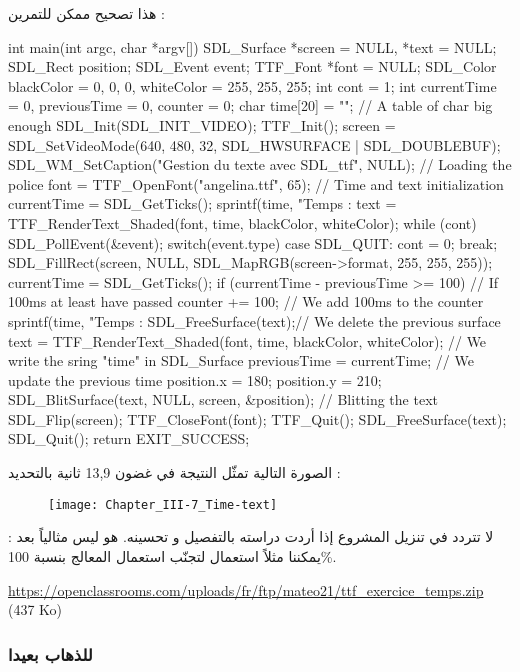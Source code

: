 هذا تصحيح ممكن للتمرين :

\begin{Csource}
int main(int argc, char *argv[])
{
	SDL_Surface *screen = NULL, *text = NULL;
	SDL_Rect position;
	SDL_Event event;
	TTF_Font *font = NULL;
	SDL_Color blackColor = {0, 0, 0}, whiteColor = {255, 255, 255};
	int cont = 1;
	int currentTime = 0, previousTime = 0, counter = 0;
	char time[20] = ""; // A table of char big enough
	SDL_Init(SDL_INIT_VIDEO);
	TTF_Init();
	screen = SDL_SetVideoMode(640, 480, 32, SDL_HWSURFACE | SDL_DOUBLEBUF);
	SDL_WM_SetCaption("Gestion du texte avec SDL_ttf", NULL);
	// Loading the police
	font = TTF_OpenFont("angelina.ttf", 65);
	// Time and text initialization
	currentTime = SDL_GetTicks();
	sprintf(time, "Temps : %
	text = TTF_RenderText_Shaded(font, time, blackColor, whiteColor);
	while (cont)
	{
		SDL_PollEvent(&event);
		switch(event.type)
		{
			case SDL_QUIT:
			cont = 0;
			break;
		}
		SDL_FillRect(screen, NULL, SDL_MapRGB(screen->format, 255, 255, 255));
		currentTime = SDL_GetTicks();
		if (currentTime - previousTime >= 100) // If 100ms at least have passed
		{
			counter += 100; // We add 100ms to the counter
			sprintf(time, "Temps : %
			SDL_FreeSurface(text);// We delete the previous surface
			text = TTF_RenderText_Shaded(font, time, blackColor, whiteColor); // We write the sring "time" in SDL_Surface
			previousTime = currentTime; // We update the previous time
		}
		position.x = 180;
		position.y = 210;
		SDL_BlitSurface(text, NULL, screen, &position); // Blitting the text
		SDL_Flip(screen);
	}
	TTF_CloseFont(font);
	TTF_Quit();
	SDL_FreeSurface(text);
	SDL_Quit();
	return EXIT_SUCCESS;
}
\end{Csource}
 
الصورة التالية تمثّل النتيجة في غضون 13,9 ثانية بالتحديد :

\begin{figure}[H]
	\centering
	\texttt{[image: Chapter\_III-7\_Time-text]}
\end{figure}

لا تتردد في تنزيل المشروع إذا أردت دراسته بالتفصيل و تحسينه. هو ليس مثالياً بعد : يمكننا مثلاً استعمال
لتجنّب استعمال المعالج بنسبة 100\%.

\textenglish{\url{https://openclassrooms.com/uploads/fr/ftp/mateo21/ttf_exercice_temps.zip} (437 Ko)}

\subsubsection{للذهاب بعيدا}

